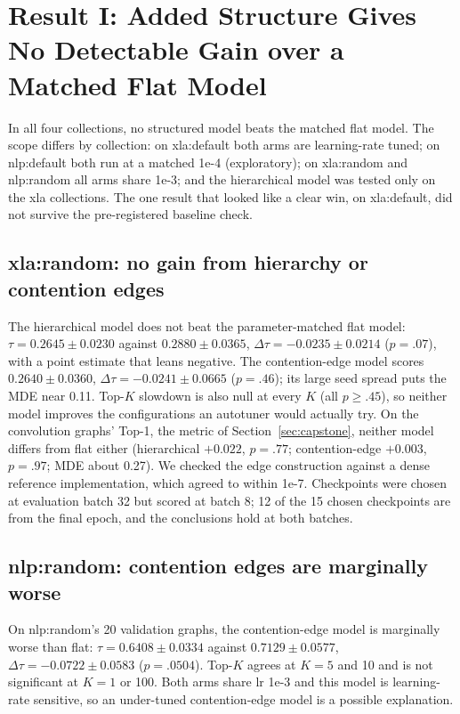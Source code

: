 \section{Result I: Added Structure Gives No Detectable Gain over a Matched Flat Model}
\label{sec:result1}
In all four collections, no structured model beats the matched flat model. The scope differs by
collection: on xla:default both arms are learning-rate tuned; on nlp:default both run at a matched 1e-4
(exploratory); on xla:random and nlp:random all arms share 1e-3; and the hierarchical model was tested
only on the xla collections. The one result that looked like a clear win, on xla:default, did not
survive the pre-registered baseline check.

\subsection{xla:random: no gain from hierarchy or contention edges}
\label{sec:xla-random}
The hierarchical model does not beat the parameter-matched flat model: $\tau = 0.2645 \pm 0.0230$
against $0.2880 \pm 0.0365$, $\Delta\tau = -0.0235 \pm 0.0214$ ($p = .07$), with a point estimate that
leans negative. The contention-edge model scores $0.2640 \pm 0.0360$, $\Delta\tau = -0.0241 \pm
0.0665$ ($p = .46$); its large seed spread puts the MDE near 0.11. Top-$K$ slowdown is also null at
every $K$ (all $p \geq .45$), so neither model improves the configurations an autotuner would actually
try. On the convolution graphs' Top-1, the metric of Section~\ref{sec:capstone}, neither model differs
from flat either (hierarchical $+0.022$, $p = .77$; contention-edge $+0.003$, $p = .97$; MDE about
0.27). We checked the edge construction against a dense reference implementation, which agreed to
within 1e-7. Checkpoints were chosen at evaluation batch 32 but scored at batch 8; 12 of the 15 chosen
checkpoints are from the final epoch, and the conclusions hold at both batches.

\subsection{nlp:random: contention edges are marginally worse}
\label{sec:nlp-random}
On nlp:random's 20 validation graphs, the contention-edge model is marginally worse than flat:
$\tau = 0.6408 \pm 0.0334$ against $0.7129 \pm 0.0577$, $\Delta\tau = -0.0722 \pm 0.0583$
($p = .0504$). Top-$K$ agrees at $K = 5$ and 10 and is not significant at $K = 1$ or 100. Both arms
share lr 1e-3 and this model is learning-rate sensitive, so an under-tuned contention-edge model is a
possible explanation.


